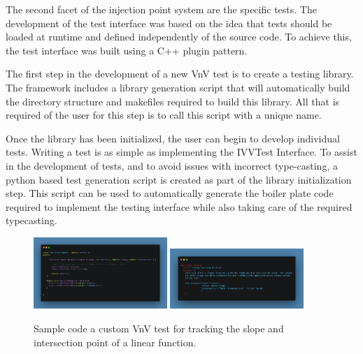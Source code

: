 The second facet of the injection point system are the specific \VV tests. The development of the 
test interface was based on the idea that tests should be loaded at runtime and defined independently of the source code. To achieve this, the test interface was built using a C++ plugin pattern. 

The first step in the development of a new VnV test is to create a testing library. The framework includes a library generation script that will automatically build the directory structure and makefiles required to 
build this library. All that is required of the user for this step is to call this script with a unique name. 

Once the library has been initialized, the user can begin to develop individual tests. Writing a test is as simple as implementing the IVVTest Interface. To assist in the development of tests, and to avoid issues with incorrect type-casting, a python based test generation script is created as part of the library initialization step. This script can be used to automatically generate the boiler plate code required to implement the testing interface while also taking care of the required typecasting. 


\begin{figure}
 \centering
 \includegraphics[width=0.45\textwidth]{./narrative/figures/testcode-example.png}
 \includegraphics[width=0.45\textwidth]{./narrative/figures/test-example.png} 
 \caption{Sample code a custom VnV test for tracking the slope and intersection point of a linear function. \label{fig:test-example}}
\end{figure}


